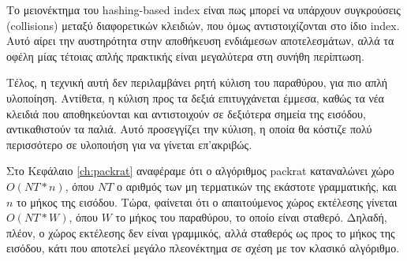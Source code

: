 Το μειονέκτημα του hashing-based index είναι πως μπορεί να υπάρχουν συγκρούσεις (collisions) μεταξύ διαφορετικών κλειδιών, που όμως αντιστοιχίζονται στο ίδιο index.
Αυτό αίρει την αυστηρότητα στην αποθήκευση ενδιάμεσων αποτελεσμάτων, αλλά τα οφέλη μίας τέτοιας απλής πρακτικής είναι μεγαλύτερα στη συνήθη περίπτωση.

Τέλος, η τεχνική αυτή δεν περιλαμβάνει ρητή κύλιση του παραθύρου, για πιο απλή υλοποίηση.
Αντίθετα, η κύλιση προς τα δεξιά επιτυγχάνεται έμμεσα, καθώς τα νέα κλειδιά που αποθηκεύονται και αντιστοιχούν σε δεξιότερα σημεία της εισόδου, αντικαθιστούν τα παλιά.
Αυτό προσεγγίζει την κύλιση, η οποία θα κόστιζε πολύ περισσότερο σε υλοποιήση για να γίνεται επ'ακριβώς.

Στο Κεφάλαιο \ref{ch:packrat} αναφέραμε ότι ο αλγόριθμος packrat καταναλώνει χώρο $O(NT * n)$, όπου $NT$ ο αριθμός των μη τερματικών της εκάστοτε γραμματικής, και $n$ το μήκος της εισόδου. 
Τώρα, φαίνεται ότι ο απαιτούμενος χώρος εκτέλεσης γίνεται $O(NT * W)$, όπου $W$ το μήκος του παραθύρου, το οποίο είναι σταθερό.
Δηλαδή, πλέον, ο χώρος εκτέλεσης δεν είναι γραμμικός, αλλά σταθερός ως προς το μήκος της εισόδου, κάτι που αποτελεί μεγάλο πλεονέκτημα σε σχέση με τον κλασικό αλγόριθμο.
